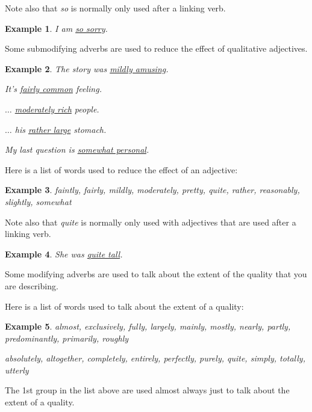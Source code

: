 \documentclass[oneside]{book}
\numberwithin{equation}{section}
\newtheorem{example}{Example}[section]
\begin{document}
%
Note also that \textit{so} is normally only used after a linking verb.
\begin{example}
    I am \underline{so sorry}.
\end{example}
%
\noindent{} Some submodifying adverbs are used to reduce the effect of qualitative adjectives.
\begin{example}
    The story was \underline{mildly amusing}.
    
    It's \underline{fairly common} feeling.
    
    $\ldots$ \underline{moderately rich} people.
    
    $\ldots$ his \underline{rather large} stomach.
    
    My last question is \underline{somewhat personal}.
\end{example}
Here is a list of words used to reduce the effect of an adjective:
\begin{example}
    faintly, fairly, mildly, moderately, pretty, quite, rather, reasonably, slightly, somewhat
\end{example}
Note also that \textit{quite} is normally only used with adjectives that are used after a linking verb.
\begin{example}
    She was \underline{quite tall}.
\end{example}
%
\noindent{} Some modifying adverbs are used to talk about the extent of the quality that you are describing.

%
Here is a list of words used to talk about the extent of a quality:
\begin{example}
    almost, exclusively, fully, largely, mainly, mostly, nearly, partly, predominantly, primarily, roughly
    
    absolutely, altogether, completely, entirely, perfectly, purely, quite, simply, totally, utterly
\end{example}
%
\noindent{} The 1st group in the list above are used almost always just to talk about the extent of a quality.
\end{document}

